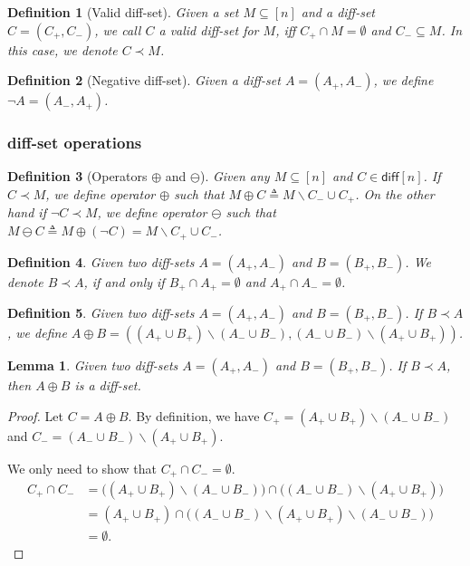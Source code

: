 \documentclass{article}
\newtheorem{define}{Definition}
\newtheorem{lemma}{Lemma}
\newcommand{\diff}{\mathsf{diff}}
\newcommand{\diffvalid}{\prec}
\newcommand{\del}{\backslash}
\begin{document}
\begin{spacing}{1.1}
\begin{define}[Valid diff-set]
Given a set $M \subseteq [n]$ and a diff-set $C=(C_+,C_-)$, we call $C$ a \emph{valid diff-set} for $M$, iff $C_+ \cap M = \emptyset$ and $C_- \subseteq M$.
In this case, we denote $C\diffvalid M$.
\end{define}

\begin{define}[Negative diff-set]
Given a diff-set $A=(A_+,A_-)$, we define $\neg A=(A_-,A_+)$.
\end{define}


\subsubsection{diff-set operations}

\begin{define}[Operators $\oplus$ and $\ominus$]
Given any $M \subseteq [n]$ and $C \in \diff[n]$.
If $C\diffvalid M$, we define operator $\oplus$ such that $M \oplus C \triangleq M\del C_- \cup C_+ $.
On the other hand if $\neg C\diffvalid M$, we define operator $\ominus$ such that $M \ominus C \triangleq M\oplus (\neg C) = 
M\del C_+ \cup C_- $.
\end{define}


\begin{define}
Given two diff-sets $A=(A_+,A_-)$ and $B=(B_+,B_-)$.
We denote $B \diffvalid A$, if and only if $B_+\cap A_+ = \emptyset$ and $A_+\cap A_-=\emptyset$.
\end{define}

\begin{define}
Given two diff-sets $A=(A_+,A_-)$ and $B=(B_+,B_-)$. 
If $B\diffvalid A$, we define $A\oplus B = ( (A_+\cup B_+)\del(A_-\cup B_-), (A_-\cup B_-)\del(A_+\cup B_+))$.
\end{define}

\begin{lemma}
Given two diff-sets $A=(A_+,A_-)$ and $B=(B_+,B_-)$. 
If $B\diffvalid A$, then 
$A\oplus B$ is a diff-set.
\end{lemma}

\begin{proof}
Let $C=A\oplus B$.
By definition, we have $C_+ = (A_+\cup B_+)\del(A_-\cup B_-)$ and $C_-=(A_-\cup B_-)\del(A_+\cup B_+)$.

We only need to show that $C_+\cap C_-=\emptyset$.
\begin{align*}
	C_+ \cap C_- &= \big((A_+\cup B_+)\del(A_-\cup B_-)\big)\cap\big((A_-\cup B_-)\del(A_+\cup B_+)\big)\\
			     &= (A_+\cup B_+)\cap\big((A_-\cup B_-)\del(A_+\cup B_+) \del (A_-\cup B_-)\big) \\
			     &= \emptyset.
\end{align*}
\end{proof}


\end{spacing}
\end{document}
